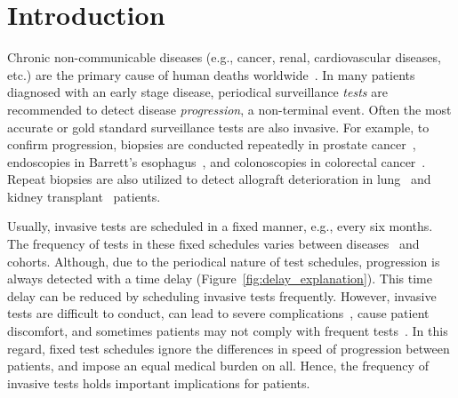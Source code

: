 \section{Introduction}
\label{sec:introduction}
Chronic non-communicable diseases (e.g., cancer, renal, cardiovascular diseases, etc.) are the primary cause of human deaths worldwide~\citep{alwan2010monitoring}. In many patients diagnosed with an early stage disease, periodical surveillance \textit{tests} are recommended to detect disease \textit{progression}, a non-terminal event. Often the most accurate or gold standard surveillance tests are also invasive. For example, to confirm progression, biopsies are conducted repeatedly in prostate cancer~\citep{bokhorst2015compliance}, endoscopies in Barrett's esophagus~\citep{streitz1993endoscopic}, and colonoscopies in colorectal cancer~\citep{krist2007timing}. Repeat biopsies are also utilized to detect allograft deterioration in lung~\citep{mcwilliams2008surveillance} and kidney transplant~\citep{henderson2011surveillance} patients.

Usually, invasive tests are scheduled in a fixed manner, e.g., every six months. The frequency of tests in these fixed schedules varies between diseases~\citep{henderson2011surveillance,bokhorst2015compliance,krist2007timing} and cohorts. Although, due to the periodical nature of test schedules, progression is always detected with a time delay (Figure~\ref{fig:delay_explanation}). This time delay can be reduced by scheduling invasive tests frequently. However, invasive tests are difficult to conduct, can lead to severe complications~\citep{loeb2013systematic,krist2007timing}, cause patient discomfort, and sometimes patients may not comply with frequent tests~\citep{bokhorst2015compliance}. In this regard, fixed test schedules ignore the differences in speed of progression between patients, and impose an equal medical burden on all. Hence, the frequency of invasive tests holds important implications for patients.


